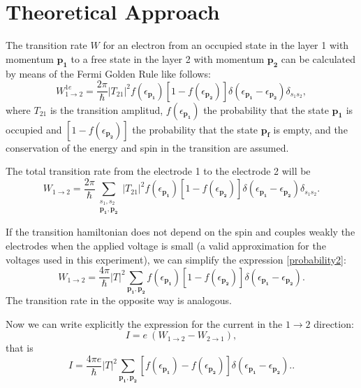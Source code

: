 \documentclass[twocolumn, twoside,a4paper,10pt]{article}
\begin{document}
\section{Theoretical Approach}
The transition rate $W$ for an electron from an occupied state in the layer 1 with momentum $\mathbf{p_1}$ to a free state in the layer 2 with momentum $\mathbf{p_2}$ can be calculated by means of the Fermi Golden Rule like follows:
\begin{equation}\label{probability1}
W_{1\to 2}^{1e} = \frac{2\pi}{\hbar} |T_{21}|^2 f(\epsilon_{\mathbf{p_1}}) [1-f(\epsilon_{\mathbf{p_2}})]
		\delta(\epsilon_{\mathbf{p_1}}-\epsilon_{\mathbf{p_2}})\delta_{s_1s_2},
\end{equation}
where $T_{21}$ is the transition amplitud, $ f(\epsilon_{\mathbf{p_1}})$ the probability that the state $\mathbf{p_1}$ is occupied and  $[1-f(\epsilon_{\mathbf{p_2}})]$ the probability that the state $\mathbf{p_f}$ is empty, and the conservation of the energy and spin in the transition are assumed. 

The total transition rate from the electrode 1 to the electrode 2 will be
\begin{equation}\label{probability2}
W_{1\to 2} = \frac{2\pi}{\hbar} \sum_{\substack{s_1,s_2\\ \mathbf{p_1},\mathbf{p_2}}} |T_{21}|^2 
		f(\epsilon_{\mathbf{p_1}}) [1-f(\epsilon_{\mathbf{p_2}})] 
		\delta(\epsilon_{\mathbf{p_1}}-\epsilon_{\mathbf{p_2}})\delta_{s_1s_2}.
\end{equation}

If the transition hamiltonian does not depend on the spin and couples weakly the electrodes when the applied voltage is small (a valid approximation for the voltages used in this experiment), we can simplify the expression \eqref{probability2}:
\begin{equation}\label{probability3}
W_{1\to 2} = \frac{4\pi}{\hbar} |T|^2 \sum_{\mathbf{p_1},\mathbf{p_2}}  
		f(\epsilon_{\mathbf{p_1}}) [1-f(\epsilon_{\mathbf{p_2}})] 
		\delta(\epsilon_{\mathbf{p_1}}-\epsilon_{\mathbf{p_2}}).
\end{equation}
The transition rate in the opposite way is analogous.

Now we can write explicitly the expression for the current in the $1\to 2$ direction:
\begin{equation}\label{current1}
I = e\ (W_{1\to 2} - W_{2\to 1}),
\end{equation}
that is
\begin{equation}\label{current2}
I = \frac{4\pi e}{\hbar} |T|^2 \sum_{\mathbf{p_1},\mathbf{p_2}}  
		[f(\epsilon_{\mathbf{p_1}})-f(\epsilon_{\mathbf{p_2}})] 
		\delta(\epsilon_{\mathbf{p_1}}-\epsilon_{\mathbf{p_2}})..
\end{equation}
\end{document}
